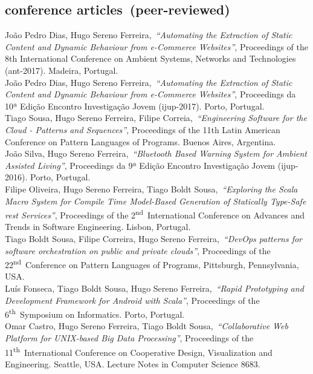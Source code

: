 \documentclass[9pt, a4paper, pstricks]{article}
\newcommand{\current}{{\hspace{-0.97em}\color{feup}$\star$}~}
\newcommand{\years}[1]{\marginnote{\small #1}}
\newcommand{\nth}{\textsuperscript{th}~}
\newcommand{\nd}{\textsuperscript{nd}~}
\newcommand{\publication}[4]{\years{#1}#2,~\emph{``#3''}, #4}
\begin{document}
{\subsection*{conference articles~(peer-reviewed)}

\noindent
\publication{\current 2017}{João Pedro Dias, Hugo Sereno Ferreira}{Automating the Extraction of Static Content and Dynamic Behaviour from e-Commerce Websites}{Proceedings of the 8th International Conference on Ambient Systems, Networks and Technologies {\sc (ant-2017)}. Madeira, Portugal.}\\
\publication{2017}{João Pedro Dias, Hugo Sereno Ferreira}{Automating the Extraction of Static Content and Dynamic Behaviour from e-Commerce Websites}{Proceedings da 10ª Edição Encontro Investigação Jovem {\sc (ijup-2017)}. Porto, Portugal.}\\
\publication{2016}{Tiago Sousa, Hugo Sereno Ferreira, Filipe Correia}{Engineering Software for the Cloud - Patterns and Sequences}{Proceedings of the 11th Latin American Conference on Pattern Languages of Programs. Buenos Aires, Argentina.}\\
\publication{2016}{João Silva, Hugo Sereno Ferreira}{Bluetooth Based Warning System for Ambient Assisted Living}{Proceedings da 9ª Edição Encontro Investigação Jovem {\sc (ijup-2016)}. Porto, Portugal.}\\
\publication{2015}{Filipe Oliveira, Hugo Sereno Ferreira, Tiago Boldt Sousa}{Exploring the Scala Macro System for Compile Time Model-Based Generation of Statically Type-Safe {\sc rest} Services}{Proceedings of the 2\nd International Conference on Advances and Trends in Software Engineering. Lisbon, Portugal.}\\
\publication{2015}{Tiago Boldt Sousa, Filipe Correira, Hugo Sereno Ferreira}{DevOps patterns for software orchestration on public and private clouds}{Proceedings of the 22\nd Conference on Pattern Languages of Programs, Pittsburgh, Pennsylvania, USA.}\\
\publication{2014}{Luís Fonseca, Tiago Boldt Sousa, Hugo Sereno Ferreira}{Rapid Prototyping and Development Framework for Android with Scala}{Proceedings of the 6\nth Symposium on Informatics. Porto, Portugal.}\\
\publication{2014}{Omar Castro, Hugo Sereno Ferreira, Tiago Boldt Sousa}{Collaborative Web Platform for UNIX-based Big Data Processing}{Proceedings of the 11\nth International Conference on Cooperative Design, Visualization and Engineering. Seattle, USA. Lecture Notes in Computer Science 8683.}\\
}
\end{document}
